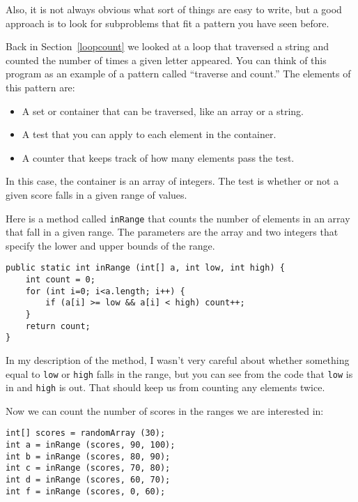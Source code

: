 \documentclass{book}
\begin{document}
Also, it is not always obvious what sort of things are easy to write,
but a good approach is to look for subproblems that fit a pattern you
have seen before.

Back in Section~\ref{loopcount} we looked at a loop that traversed a
string and counted the number of times a given letter appeared.  You
can think of this program as an example of a pattern called ``traverse
and count.''  The elements of this pattern are:

\begin{itemize}

\item A set or container that can be traversed, like an array
or a string.

\item A test that you can apply to each element in the container.

\item A counter that keeps track of how many elements pass
the test.

\end{itemize}

In this case, the container is an array of integers.  The
test is whether or not a given score falls in a given range of
values.

Here is a method called {\tt inRange}
that counts the number of elements in an array that fall
in a given range.  The parameters are the array and two
integers that specify the lower and upper bounds of
the range.

\begin{verbatim}
public static int inRange (int[] a, int low, int high) {
    int count = 0;
    for (int i=0; i<a.length; i++) {
        if (a[i] >= low && a[i] < high) count++;
    }
    return count;
}
\end{verbatim}
%
In my description of the method,
I wasn't very careful about whether something equal
to {\tt low} or {\tt high} falls in the range, but you can
see from the code that {\tt low} is in and {\tt high} is out.
That should keep us from counting any elements twice.

Now we can count the number of scores in the ranges we are
interested in:

\begin{verbatim}
int[] scores = randomArray (30);
int a = inRange (scores, 90, 100);
int b = inRange (scores, 80, 90);
int c = inRange (scores, 70, 80);
int d = inRange (scores, 60, 70);
int f = inRange (scores, 0, 60);
\end{verbatim}
\end{document}
